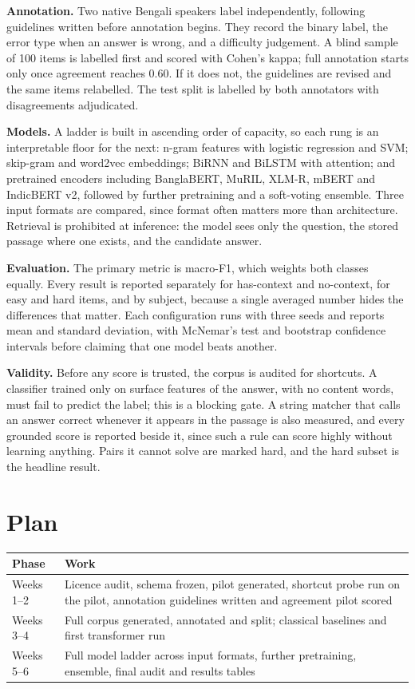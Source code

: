 \documentclass[11pt,a4paper]{article}
\begin{document}
\textbf{Annotation.} Two native Bengali speakers label independently, following
guidelines written before annotation begins. They record the binary label, the
error type when an answer is wrong, and a difficulty judgement. A blind sample
of 100 items is labelled first and scored with Cohen's kappa; full annotation
starts only once agreement reaches 0.60. If it does not, the guidelines are
revised and the same items relabelled. The test split is labelled by both
annotators with disagreements adjudicated.

\textbf{Models.} A ladder is built in ascending order of capacity, so each rung
is an interpretable floor for the next: n-gram features with logistic regression
and SVM; skip-gram and word2vec embeddings; BiRNN and BiLSTM with attention; and
pretrained encoders including BanglaBERT, MuRIL, XLM-R, mBERT and IndicBERT v2,
followed by further pretraining and a soft-voting ensemble. Three input formats
are compared, since format often matters more than architecture. Retrieval is
prohibited at inference: the model sees only the question, the stored passage
where one exists, and the candidate answer.

\textbf{Evaluation.} The primary metric is macro-F1, which weights both classes
equally. Every result is reported separately for has-context and no-context, for
easy and hard items, and by subject, because a single averaged number hides the
differences that matter. Each configuration runs with three seeds and reports
mean and standard deviation, with McNemar's test and bootstrap confidence
intervals before claiming that one model beats another.

\textbf{Validity.} Before any score is trusted, the corpus is audited for
shortcuts. A classifier trained only on surface features of the answer, with no
content words, must fail to predict the label; this is a blocking gate. A string
matcher that calls an answer correct whenever it appears in the passage is also
measured, and every grounded score is reported beside it, since such a rule can
score highly without learning anything. Pairs it cannot solve are marked hard,
and the hard subset is the headline result.

\section{Plan}

\begin{center}
\small
\begin{tabular}{L{2.1cm} L{12.6cm}}
\toprule
\textbf{Phase} & \textbf{Work} \\
\midrule
Weeks 1--2 & Licence audit, schema frozen, pilot generated, shortcut probe run
on the pilot, annotation guidelines written and agreement pilot scored \\
Weeks 3--4 & Full corpus generated, annotated and split; classical baselines and
first transformer run \\
Weeks 5--6 & Full model ladder across input formats, further pretraining,
ensemble, final audit and results tables \\
\bottomrule
\end{tabular}
\end{center}
\end{document}
